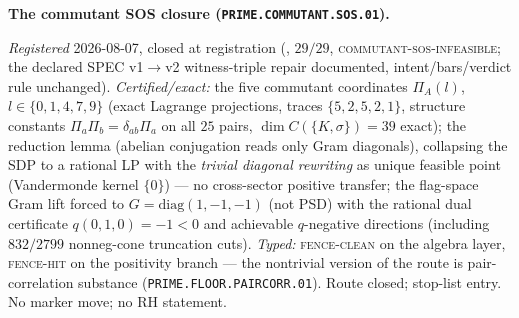 \par\smallskip\noindent\textbf{The commutant SOS closure
(\texttt{PRIME.COMMUTANT.SOS.01}).}
{\sloppy
\emph{Registered} 2026-08-07, closed at registration
(, $29/29$,
\textsc{commutant-sos-infeasible}; the declared SPEC v1$\to$v2
witness-triple repair documented, intent/bars/verdict rule
unchanged).  \emph{Certified/exact:} the five commutant
coordinates $\Pi_A(l)$, $l \in \{0,1,4,7,9\}$ (exact Lagrange
projections, traces $\{5,2,5,2,1\}$, structure constants
$\Pi_a\Pi_b = \delta_{ab}\Pi_a$ on all $25$ pairs,
$\dim C(\{K,\sigma\}) = 39$ exact); the reduction lemma (abelian
conjugation reads only Gram diagonals), collapsing the SDP to a
rational LP with the \emph{trivial diagonal rewriting} as unique
feasible point (Vandermonde kernel $\{0\}$) --- no cross-sector
positive transfer; the flag-space Gram lift forced to
$G = \mathrm{diag}(1,-1,-1)$ (not PSD) with the rational dual
certificate $q(0,1,0) = -1 < 0$ and achievable $q$-negative
directions (including $832/2799$ nonneg-cone truncation cuts).
\emph{Typed:} \textsc{fence-clean} on the algebra layer,
\textsc{fence-hit} on the positivity branch --- the nontrivial
version of the route is pair-correlation substance
(\texttt{PRIME.FLOOR.PAIRCORR.01}).  Route closed; stop-list
entry.  No marker move; no RH statement.\par}


